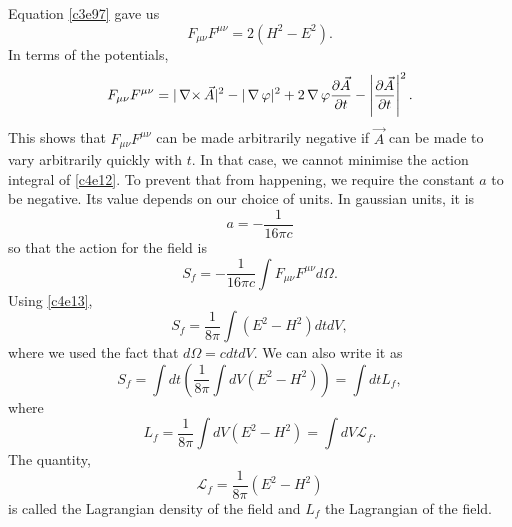 \begin{enumerate}
Equation \eqref{c3e97} gave us
\begin{equation}\label{c4e13}
F_{\mu\nu}F^{\mu\nu} = 2(H^2 - E^2).
\end{equation}
In terms of the potentials,
\begin{equation}\label{c4e14}
F_{\mu\nu}F^{\mu\nu} = |\operatorname{\nabla\times}\vec{A}|^2 - |\operatorname{\nabla}\varphi|^2 + 
2\operatorname{\nabla}\varphi\frac{\partial{\vec{A}}}{\partial{t}} - \left|\frac{\partial{\vec{A}}}{\partial{t}}\right|^2.
\end{equation}
This shows that $F_{\mu\nu}F^{\mu\nu}$ can be made arbitrarily negative if 
$\vec{A}$ can be made to vary arbitrarily quickly with $t$. In that case, we 
cannot minimise the action integral of \eqref{c4e12}. To prevent that from 
happening, we require the constant $a$ to be negative. Its value depends on 
our choice of units. In gaussian units, it is 
\[
a = -\frac{1}{16\pi c}
\]
so that the action for the field is
\begin{equation}\label{c4e15}
S_f = -\frac{1}{16\pi c}\int F_{\mu\nu}F^{\mu\nu} d\Omega.
\end{equation}
Using \eqref{c4e13},
\begin{equation}\label{c4e16}
S_f = \frac{1}{8\pi}\int (E^2 - H^2) dt dV,
\end{equation}
where we used the fact that $d\Omega = cdtdV$. We can also write it as
\begin{equation}\label{c4e17}
S_f = \int dt \left(\frac{1}{8\pi}\int dV (E^2 - H^2)\right) = \int dt L_f,
\end{equation}
where
\begin{equation}\label{c4e18}
L_f = \frac{1}{8\pi}\int dV (E^2 - H^2) = \int dV \mathcal{L}_f.
\end{equation}
The quantity,
\begin{equation}\label{c4e19}
\mathcal{L}_f = \frac{1}{8\pi}(E^2 - H^2)
\end{equation}
is called the Lagrangian density of the field and $L_f$ the Lagrangian of the 
field.


\end{enumerate}
